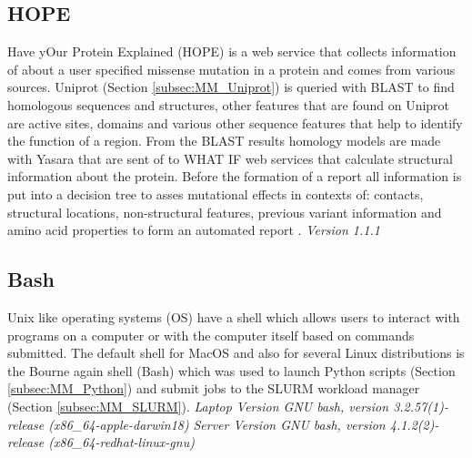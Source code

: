 \subsection{HOPE}
Have yOur Protein Explained (HOPE) is a web service that collects information of about a user specified missense mutation in a protein and comes from various sources. Uniprot (Section \ref{subsec:MM_Uniprot}) is queried with BLAST to find homologous sequences and structures, other features that are found on Uniprot are active sites, domains and various other sequence features that help to identify the function of a region. From the BLAST results homology models are made with Yasara that are sent of to WHAT IF web services that calculate structural information about the protein. Before the formation of a report all information is put into a decision tree to asses mutational effects in contexts of: contacts, structural locations, non-structural features, previous variant information and amino acid properties to form an automated report \cite{}.
\label{subsec:MM_HOPE}
\textit{Version 1.1.1}

\subsection{Bash}
Unix like operating systems (OS) have a shell which allows users to interact with programs on a computer or with the computer itself based on commands submitted.  The default shell for MacOS and also for several Linux distributions is the Bourne again shell (Bash) which was used to launch Python scripts (Section \ref{subsec:MM_Python}) and submit jobs to the SLURM workload manager (Section \ref{subsec:MM_SLURM}). 
\label{subsec:MM_Bash}
\newline
\textit{Laptop Version GNU bash, version 3.2.57(1)-release (x86\_64-apple-darwin18)}
\newline
\textit{Server Version GNU bash, version 4.1.2(2)-release (x86\_64-redhat-linux-gnu)}

